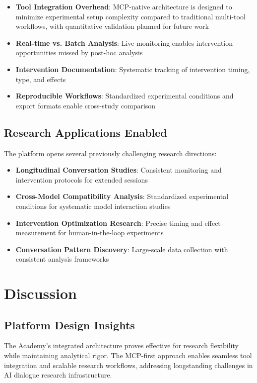 \documentclass[11pt,letterpaper]{article}
\newcommand{\theacademy}{The Academy}
\newcommand{\mcp}{MCP}
\begin{document}
\begin{itemize}
    \item \textbf{Tool Integration Overhead}: \mcp{}-native architecture is designed to minimize experimental setup complexity compared to traditional multi-tool workflows, with quantitative validation planned for future work
    \item \textbf{Real-time vs. Batch Analysis}: Live monitoring enables intervention opportunities missed by post-hoc analysis
    \item \textbf{Intervention Documentation}: Systematic tracking of intervention timing, type, and effects
    \item \textbf{Reproducible Workflows}: Standardized experimental conditions and export formats enable cross-study comparison
\end{itemize}

\subsection{Research Applications Enabled}

The platform opens several previously challenging research directions:

\begin{itemize}
    \item \textbf{Longitudinal Conversation Studies}: Consistent monitoring and intervention protocols for extended sessions
    \item \textbf{Cross-Model Compatibility Analysis}: Standardized experimental conditions for systematic model interaction studies
    \item \textbf{Intervention Optimization Research}: Precise timing and effect measurement for human-in-the-loop experiments
    \item \textbf{Conversation Pattern Discovery}: Large-scale data collection with consistent analysis frameworks
\end{itemize}

\section{Discussion}

\subsection{Platform Design Insights}

\theacademy{}'s integrated architecture proves effective for research flexibility while maintaining analytical rigor. The \mcp{}-first approach enables seamless tool integration and scalable research workflows, addressing longstanding challenges in AI dialogue research infrastructure.
\end{document}
